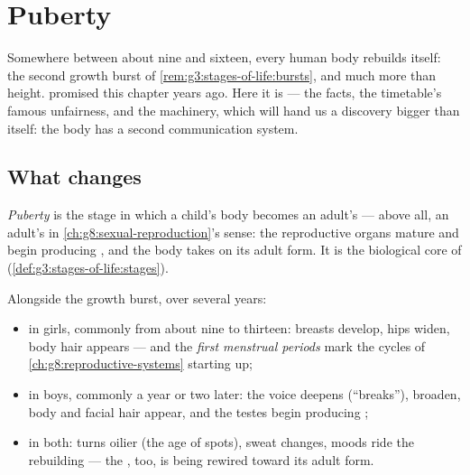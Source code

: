 \chapter{Puberty}\label{ch:g8:puberty}

Somewhere between about nine and sixteen, every human body
rebuilds itself: the second growth burst of
\cref{rem:g3:stages-of-life:bursts}, and much more than
height.  promised
this chapter years ago. Here it is --- the facts, the
timetable's famous unfairness, and the machinery, which will
hand us a discovery bigger than  itself: the body has
a second communication system.

\section{What changes}

\begin{definition}[Puberty]\label{def:g8:puberty:puberty}
\emph{Puberty} is the stage in which a
child's body becomes an adult's --- above all, an adult's
in \cref{ch:g8:sexual-reproduction}'s sense: the
reproductive organs mature and begin producing
\emph{}, and the body takes on its adult form.
It is the biological core of 
(\cref{def:g3:stages-of-life:stages}).
\end{definition}

\begin{proposition}\label{prop:g8:puberty:changes}
Alongside the growth burst, over several years:
\begin{itemize}
  \item in girls, commonly from about nine to thirteen:
        breasts develop, hips widen, body hair appears ---
        and the \emph{first menstrual periods} mark the
        cycles of \cref{ch:g8:reproductive-systems} starting
        up;
  \item in boys, commonly a year or two later: the voice
        deepens (``breaks''),  broaden, body and
        facial hair appear, and the testes begin producing
        ;
  \item in both:  turns oilier (the age of spots),
        sweat changes, moods ride the rebuilding --- the
        , too, is being rewired toward its adult form.
\end{itemize}
\end{proposition}
\admitted

